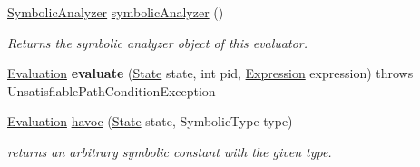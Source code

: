 \begin{DoxyCompactItemize}
\item 
\hyperlink{interfaceedu_1_1udel_1_1cis_1_1vsl_1_1civl_1_1semantics_1_1IF_1_1SymbolicAnalyzer}{Symbolic\+Analyzer} \hyperlink{classedu_1_1udel_1_1cis_1_1vsl_1_1civl_1_1semantics_1_1common_1_1CommonEvaluator_a2b71c67fa246fdcb9121f4d9e4341c9f}{symbolic\+Analyzer} ()
\begin{DoxyCompactList}\small\item\em Returns the symbolic analyzer object of this evaluator. \end{DoxyCompactList}\item 
\hypertarget{classedu_1_1udel_1_1cis_1_1vsl_1_1civl_1_1semantics_1_1common_1_1CommonEvaluator_a9bc3c6628906631f8249730315f6127d}{}\hyperlink{classedu_1_1udel_1_1cis_1_1vsl_1_1civl_1_1semantics_1_1IF_1_1Evaluation}{Evaluation} {\bfseries evaluate} (\hyperlink{interfaceedu_1_1udel_1_1cis_1_1vsl_1_1civl_1_1state_1_1IF_1_1State}{State} state, int pid, \hyperlink{interfaceedu_1_1udel_1_1cis_1_1vsl_1_1civl_1_1model_1_1IF_1_1expression_1_1Expression}{Expression} expression)  throws Unsatisfiable\+Path\+Condition\+Exception \label{classedu_1_1udel_1_1cis_1_1vsl_1_1civl_1_1semantics_1_1common_1_1CommonEvaluator_a9bc3c6628906631f8249730315f6127d}

\item 
\hyperlink{classedu_1_1udel_1_1cis_1_1vsl_1_1civl_1_1semantics_1_1IF_1_1Evaluation}{Evaluation} \hyperlink{classedu_1_1udel_1_1cis_1_1vsl_1_1civl_1_1semantics_1_1common_1_1CommonEvaluator_a8c9138a366632db843ca39c5fa4a5bd8}{havoc} (\hyperlink{interfaceedu_1_1udel_1_1cis_1_1vsl_1_1civl_1_1state_1_1IF_1_1State}{State} state, Symbolic\+Type type)
\begin{DoxyCompactList}\small\item\em returns an arbitrary symbolic constant with the given type. \end{DoxyCompactList}\end{DoxyCompactItemize}
